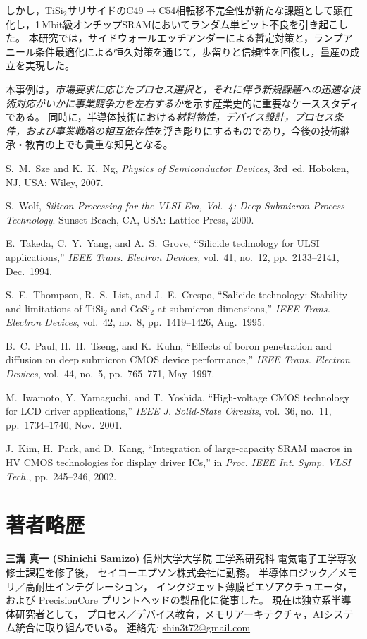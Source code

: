 \documentclass[conference]{IEEEtran}
\begin{document}
しかし，TiSi$_2$サリサイドのC49$\to$C54相転移不完全性が新たな課題として顕在化し，1\,Mbit級オンチップSRAMにおいてランダム単ビット不良を引き起こした。  
本研究では，サイドウォールエッチアンダーによる暫定対策と，ランプアニール条件最適化による恒久対策を通じて，歩留りと信頼性を回復し，量産の成立を実現した。  

本事例は，\emph{市場要求に応じたプロセス選択と，それに伴う新規課題への迅速な技術対応がいかに事業競争力を左右するか}を示す産業史的に重要なケーススタディである。  
同時に，半導体技術における\emph{材料物性，デバイス設計，プロセス条件，および事業戦略の相互依存性}を浮き彫りにするものであり，今後の技術継承・教育の上でも貴重な知見となる。

\begin{thebibliography}{8}

S.~M.~Sze and K.~K.~Ng, \emph{Physics of Semiconductor Devices}, 3rd~ed.
Hoboken, NJ, USA: Wiley, 2007.

S.~Wolf, \emph{Silicon Processing for the VLSI Era, Vol.~4: Deep-Submicron Process Technology}.
Sunset Beach, CA, USA: Lattice Press, 2000.

E.~Takeda, C.~Y.~Yang, and A.~S.~Grove, ``Silicide technology for ULSI applications,''
\emph{IEEE Trans. Electron Devices}, vol.~41, no.~12, pp.~2133--2141, Dec.~1994.

S.~E.~Thompson, R.~S.~List, and J.~E.~Crespo, 
``Salicide technology: Stability and limitations of TiSi$_2$ and CoSi$_2$ at submicron dimensions,'' 
\emph{IEEE Trans. Electron Devices}, vol.~42, no.~8, pp.~1419--1426, Aug.~1995.

B.~C.~Paul, H.~H.~Tseng, and K.~Kuhn, 
``Effects of boron penetration and diffusion on deep submicron CMOS device performance,'' 
\emph{IEEE Trans. Electron Devices}, vol.~44, no.~5, pp.~765--771, May~1997.

M.~Iwamoto, Y.~Yamaguchi, and T.~Yoshida, 
``High-voltage CMOS technology for LCD driver applications,'' 
\emph{IEEE J. Solid-State Circuits}, vol.~36, no.~11, pp.~1734--1740, Nov.~2001.

J.~Kim, H.~Park, and D.~Kang, 
``Integration of large-capacity SRAM macros in HV CMOS technologies for display driver ICs,'' 
in \emph{Proc. IEEE Int. Symp. VLSI Tech.}, pp.~245--246, 2002.

\end{thebibliography}

\section*{著者略歴}
\noindent\textbf{三溝 真一 (Shinichi Samizo)}  
信州大学大学院 工学系研究科 電気電子工学専攻修士課程を修了後，  
セイコーエプソン株式会社に勤務。  
半導体ロジック／メモリ／高耐圧インテグレーション，  
インクジェット薄膜ピエゾアクチュエータ，  
および PrecisionCore プリントヘッドの製品化に従事した。  
現在は独立系半導体研究者として，  
プロセス／デバイス教育，メモリアーキテクチャ，AIシステム統合に取り組んでいる。  
連絡先: \href{mailto:shin3t72@gmail.com}{shin3t72@gmail.com}
\end{document}
